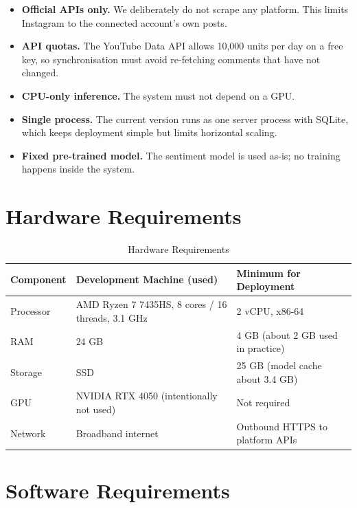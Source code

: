 \documentclass[12pt,a4paper]{report}
\newcommand{\cellpadding}{\renewcommand{\arraystretch}{1.2}}
\begin{document}
\begin{itemize}
    \item \textbf{Official APIs only.} We deliberately do not scrape any platform. This limits Instagram to the connected account's own posts.
    \item \textbf{API quotas.} The YouTube Data API allows 10,000 units per day on a free key, so synchronisation must avoid re-fetching comments that have not changed.
    \item \textbf{CPU-only inference.} The system must not depend on a GPU.
    \item \textbf{Single process.} The current version runs as one server process with SQLite, which keeps deployment simple but limits horizontal scaling.
    \item \textbf{Fixed pre-trained model.} The sentiment model is used as-is; no training happens inside the system.
\end{itemize}

\section{Hardware Requirements}

\begin{table}[H]
\centering
\cellpadding
\caption{Hardware Requirements}
\label{tab:hw}
\begin{tabular}{|P{3.2cm}|P{5.3cm}|P{5.3cm}|}
\hline
\textbf{Component} & \textbf{Development Machine (used)} & \textbf{Minimum for Deployment} \\
\hline
Processor & AMD Ryzen 7 7435HS, 8 cores / 16 threads, 3.1 GHz & 2 vCPU, x86-64 \\
\hline
RAM & 24 GB & 4 GB (about 2 GB used in practice) \\
\hline
Storage & SSD & 25 GB (model cache about 3.4 GB) \\
\hline
GPU & NVIDIA RTX 4050 (intentionally not used) & Not required \\
\hline
Network & Broadband internet & Outbound HTTPS to platform APIs \\
\hline
\end{tabular}
\end{table}

\section{Software Requirements}
\end{document}
